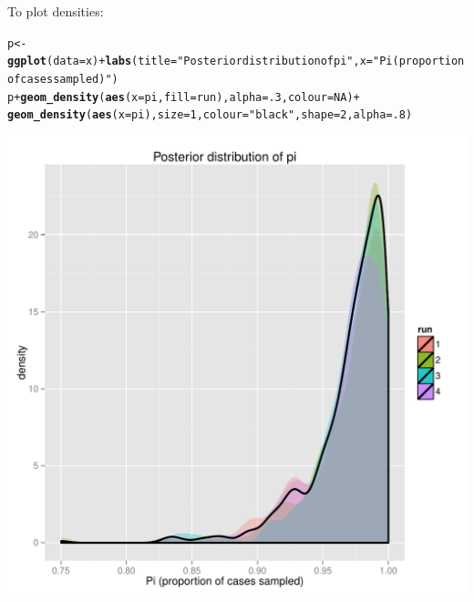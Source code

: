 \documentclass{article}\usepackage[]{graphicx}\usepackage[]{color}
\makeatletter
\newcommand{\hlnum}[1]{\textcolor[rgb]{0.686,0.059,0.569}{#1}}%
\newcommand{\hlstr}[1]{\textcolor[rgb]{0.192,0.494,0.8}{#1}}%
\newcommand{\hlopt}[1]{\textcolor[rgb]{0,0,0}{#1}}%
\newcommand{\hlstd}[1]{\textcolor[rgb]{0.345,0.345,0.345}{#1}}%
\newcommand{\hlkwb}[1]{\textcolor[rgb]{0.69,0.353,0.396}{#1}}%
\newcommand{\hlkwc}[1]{\textcolor[rgb]{0.333,0.667,0.333}{#1}}%
\newcommand{\hlkwd}[1]{\textcolor[rgb]{0.737,0.353,0.396}{\textbf{#1}}}%
\newenvironment{kframe}{%
 \def\at@end@of@kframe{}%
 \ifinner\ifhmode%
  \def\at@end@of@kframe{\end{minipage}}%
  \begin{minipage}{\columnwidth}%
 \fi\fi%
 \def\FrameCommand##1{\hskip\@totalleftmargin \hskip-\fboxsep
 \colorbox{shadecolor}{##1}\hskip-\fboxsep
     \hskip-\linewidth \hskip-\@totalleftmargin \hskip\columnwidth}%
 \MakeFramed {\advance\hsize-\width
   \@totalleftmargin\z@ \linewidth\hsize
   \@setminipage}}%
 {\par\unskip\endMakeFramed%
 \at@end@of@kframe}
\newenvironment{knitrout}{}{} %
\makeatother
\begin{document}
To plot densities:
\begin{knitrout}
\color{fgcolor}\begin{kframe}
\begin{alltt}
\hlstd{p} \hlkwb{<-} \hlkwd{ggplot}\hlstd{(}\hlkwc{data}\hlstd{=x)} \hlopt{+} \hlkwd{labs}\hlstd{(}\hlkwc{title}\hlstd{=}\hlstr{"Posterior distribution of pi"}\hlstd{,} \hlkwc{x}\hlstd{=}\hlstr{"Pi (proportion of cases sampled)"}\hlstd{)}
\hlstd{p} \hlopt{+} \hlkwd{geom_density}\hlstd{(}\hlkwd{aes}\hlstd{(}\hlkwc{x}\hlstd{=pi,} \hlkwc{fill}\hlstd{=run),} \hlkwc{alpha}\hlstd{=}\hlnum{.3}\hlstd{,} \hlkwc{colour}\hlstd{=}\hlnum{NA}\hlstd{)} \hlopt{+}
    \hlkwd{geom_density}\hlstd{(}\hlkwd{aes}\hlstd{(}\hlkwc{x}\hlstd{=pi),} \hlkwc{size}\hlstd{=}\hlnum{1}\hlstd{,} \hlkwc{colour}\hlstd{=}\hlstr{"black"}\hlstd{,} \hlkwc{shape}\hlstd{=}\hlnum{2}\hlstd{,} \hlkwc{alpha}\hlstd{=}\hlnum{.8}\hlstd{)}
\end{alltt}
\end{kframe}

{\centering \includegraphics[width=.6\textwidth]{figs/unnamed-chunk-38} 

}



\end{knitrout}
\end{document}

